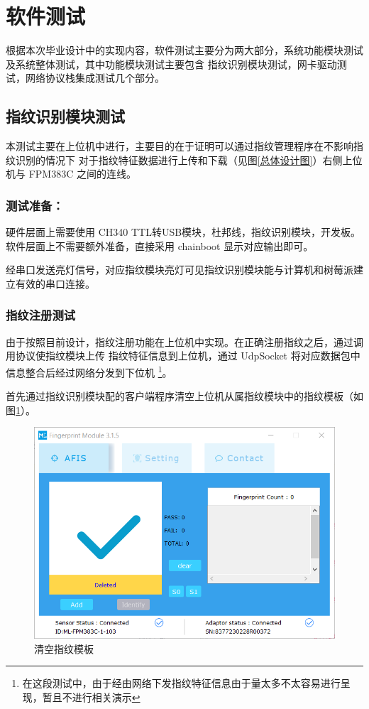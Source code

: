 \section{软件测试}

    根据本次毕业设计中的实现内容，软件测试主要分为两大部分，系统功能模块测试及系统整体测试，其中功能模块测试主要包含
    指纹识别模块测试，网卡驱动测试，网络协议栈集成测试几个部分。

    \subsection{指纹识别模块测试}

    本测试主要在上位机中进行，主要目的在于证明可以通过指纹管理程序在不影响指纹识别的情况下
    对于指纹特征数据进行上传和下载（见图\ref{总体设计图}）右侧上位机与 FPM383C 之间的连线。

    \subsubsection*{测试准备：}
    硬件层面上需要使用 CH340 TTL转USB模块，杜邦线，指纹识别模块，开发板。
    软件层面上不需要额外准备，直接采用 chainboot 显示对应输出即可。

    经串口发送亮灯信号，对应指纹模块亮灯可见指纹识别模块能与计算机和树莓派建立有效的串口连接。

    \subsubsection{指纹注册测试}
    
    由于按照目前设计，指纹注册功能在上位机中实现。在正确注册指纹之后，通过调用协议使指纹模块上传
    指纹特征信息到上位机，通过 UdpSocket 将对应数据包中信息整合后经过网络分发到下位机
    \footnote{在这段测试中，由于经由网络下发指纹特征信息由于量太多不太容易进行呈现，暂且不进行相关演示}。

    首先通过指纹识别模块配的客户端程序清空上位机从属指纹模块中的指纹模板（如图\ref{fig::清空指纹模板}）。

    \begin{figure}[ht]
        \centering
        \includegraphics[scale=0.8]{./imgs/清空指纹模板.png}
        \caption{清空指纹模板}    \label{fig::清空指纹模板}
    \end{figure}

